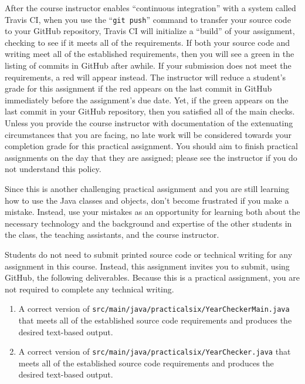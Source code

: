 \documentclass[11pt]{article}
\newcommand{\mainprogramsource}{\lstinline{src/main/java/practicalsix/YearCheckerMain.java}}
\newcommand{\secondprogramsource}{\lstinline{src/main/java/practicalsix/YearChecker.java}}
\newcommand{\gitpush}{\command{git push}}
\newcommand{\command}[1]{``\lstinline{#1}''}
\newcommand{\step}[1]{``{#1}''}
\newcommand{\checkmark}{\ding{51}}
\newcommand{\naughtmark}{\ding{55}}
\begin{document}
After the course instructor enables \step{continuous integration} with a system called Travis CI, when you use the
\gitpush{} command to transfer your source code to your GitHub repository, Travis CI will initialize a \step{build} of
your assignment, checking to see if it meets all of the requirements. If both your source code and writing meet all of
the established requirements, then you will see a green \checkmark{} in the listing of commits in GitHub after awhile.
If your submission does not meet the requirements, a red \naughtmark{} will appear instead. The instructor will reduce a
student's grade for this assignment if the red \naughtmark{} appears on the last commit in GitHub immediately before the
assignment's due date. Yet, if the green \checkmark{} appears on the last commit in your GitHub repository, then you
satisfied all of the main checks. Unless you provide the course instructor with documentation of the extenuating
circumstances that you are facing, no late work will be considered towards your completion grade for this practical
assignment. You should aim to finish practical assignments on the day that they are assigned; please see the instructor
if you do not understand this policy.

Since this is another challenging practical assignment and you are still learning how to use the Java classes and
objects, don't become frustrated if you make a mistake. Instead, use your mistakes as an opportunity for learning both
about the necessary technology and the background and expertise of the other students in the class, the teaching
assistants, and the course instructor.

\noindent Students do not need to submit printed source code or technical writing for any assignment in this course.
Instead, this assignment invites you to submit, using GitHub, the following deliverables. Because this is a practical
assignment, you are not required to complete any technical writing.

\begin{enumerate}

\setlength{\itemsep}{0in}

\item A correct version of \mainprogramsource{} that meets all of the established source code requirements and produces
  the desired text-based output.

\item A correct version of \secondprogramsource{} that meets all of the established source code requirements and
  produces the desired text-based output.

\end{enumerate}
\end{document}
